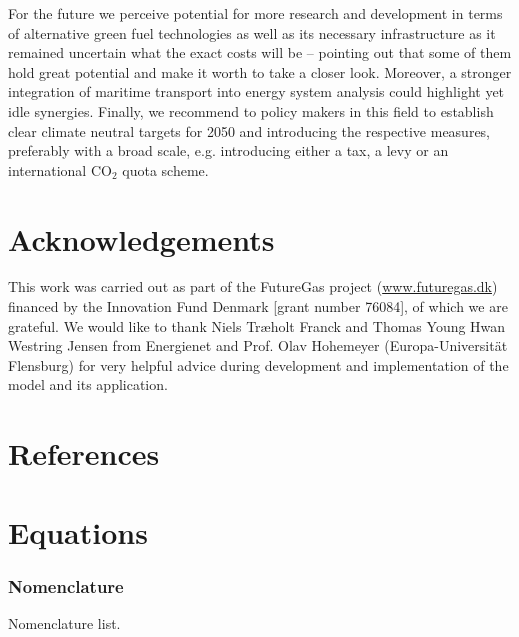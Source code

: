 \documentclass[article]{elsarticle}
\begin{document}
For the future we perceive potential for more research and development in terms of alternative green fuel technologies as well as its necessary infrastructure as it remained uncertain what the exact costs will be -- pointing out that some of them hold great potential and make it worth to take a closer look. Moreover, a stronger integration of maritime transport into energy system analysis could highlight yet idle synergies. Finally, we recommend to policy makers in this field to establish clear climate neutral targets for 2050 and introducing the respective measures, preferably with a broad scale, e.g. introducing either  a tax, a levy or an international CO$_2$ quota scheme.


\section*{Acknowledgements}
This work was carried out as part of the FutureGas project (\url{www.futuregas.dk}) financed by the Innovation Fund Denmark [grant number 76084], of which we are grateful. We would like to thank Niels Tr\ae holt Franck and Thomas Young Hwan Westring Jensen from Energienet and Prof. Olav Hohemeyer (Europa-Universit\"at Flensburg) for very helpful advice during development and implementation of the model and its application.

\section*{References}


\newpage
\appendix
\section{Equations}\label{app:equations}
\subsubsection{Nomenclature}\label{box:nomenclature}
\glsdisablehyper
\glsaddall
\begin{table}[h]
\begin{mdframed}
\footnotesize{
\begin{multicols}{2}
\printglossary[style=tree,type=a]
\vspace{-0.3cm}
\printglossary[style=tree,type=s]
\vspace{-0.3cm}
\printglossary[style=tree,type=v]
\vspace{-0.3cm}
\printglossary[style=tree,type=p]
\end{multicols}
}
\end{mdframed}
\caption*{Nomenclature list.}
\end{table}
\end{document}
